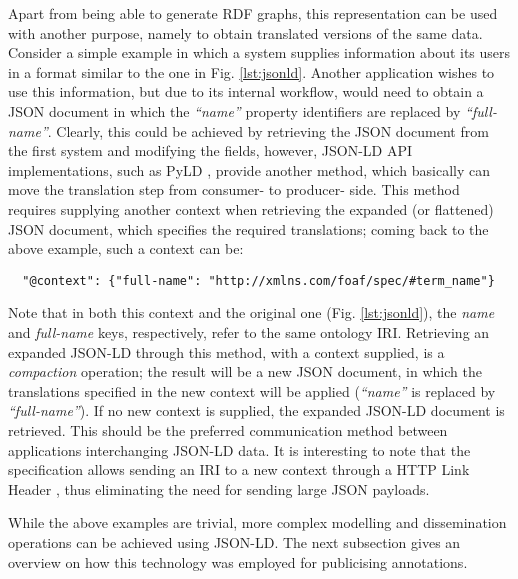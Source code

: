 Apart from being able to generate RDF graphs, this representation can be used
with another purpose, namely to obtain translated versions of the same data.
Consider a simple example in which a system supplies information about its
users in a format similar to the one in Fig. \ref{lst:jsonld}. Another
application wishes to use this information, but due to its internal workflow,
would need to obtain a JSON document in which the \textit{``name''} property
identifiers are replaced by \textit{``full-name''}.  Clearly, this could be
achieved by retrieving the JSON document from the first system and modifying
the fields, however, JSON-LD API implementations, such as PyLD \cite{ref:pyld},
provide another method, which basically can move the translation step from
consumer- to producer- side.  This method requires supplying another context
when retrieving the expanded (or flattened) JSON document, which specifies the
required translations; coming back to the above example, such a context can be:
\begin{verbatim}
  "@context": {"full-name": "http://xmlns.com/foaf/spec/#term_name"}
\end{verbatim}

Note that in both this context and the original one (Fig. \ref{lst:jsonld}),
the \textit{name} and \textit{full-name} keys, respectively, refer to the same
ontology IRI. Retrieving an expanded JSON-LD through this method, with a
context supplied, is a \textit{compaction} operation; the result will be a new
JSON document, in which the translations specified in the new context will be
applied (\textit{``name''} is replaced by \textit{``full-name''}). If no new
context is supplied, the expanded JSON-LD document is retrieved. This should be
the preferred communication method between applications interchanging JSON-LD
data. It is interesting to note that the specification allows sending an IRI to
a new context through a HTTP Link Header \cite{ref:rfc5988}, thus eliminating
the need for sending large JSON payloads.

While the above examples are trivial, more complex modelling and dissemination
operations can be achieved using JSON-LD. The next subsection gives an overview
on how this technology was employed for publicising annotations.
